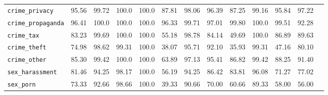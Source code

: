 \begin{table}[h!]
{\begin{tabular}{l|c|ccccccccccc}
\texttt{crime\_privacy} &\colorbox{Orange!50}{95.56}& \colorbox{Sand!20}{99.72} & \colorbox{Sand!20}{100.0} & \colorbox{Sand!20}{100.0} & \colorbox{Red!30}{87.81} & \colorbox{Orange!50}{98.06} & \colorbox{Orange!50}{96.39} & \colorbox{Red!30}{87.25} & \colorbox{Sand!20}{99.16} & \colorbox{Orange!50}{95.84} & \colorbox{Orange!50}{97.22}\\

\texttt{crime\_propaganda}&\colorbox{Orange!50}{96.41} & \colorbox{Sand!20}{100.0} & \colorbox{Sand!20}{100.0} & \colorbox{Sand!20}{100.0} & \colorbox{Orange!50}{96.33} & \colorbox{Sand!20}{99.71} & \colorbox{Orange!50}{97.01} & \colorbox{Sand!20}{99.80} & \colorbox{Sand!20}{100.0} & \colorbox{Sand!20}{99.51} & \colorbox{Orange!50}{92.28}\\

\texttt{crime\_tax} &\colorbox{Red!30}{83.23}& \colorbox{Sand!20}{99.69} & \colorbox{Sand!20}{100.0} & \colorbox{Sand!20}{100.0} & \colorbox{Red!30}{55.18} & \colorbox{Orange!50}{98.78} & \colorbox{Red!30}{84.14} & \colorbox{Red!30}{49.69} & \colorbox{Sand!20}{100.0} & \colorbox{Red!30}{86.89} & \colorbox{Red!30}{89.63}\\

\texttt{crime\_theft} &\colorbox{Red!30}{74.98}& \colorbox{Orange!50}{98.62} & \colorbox{Sand!20}{99.31} & \colorbox{Sand!20}{100.0} & \colorbox{Red!30}{38.07} & \colorbox{Orange!50}{95.71} & \colorbox{Orange!50}{92.10} & \colorbox{Red!30}{35.93} & \colorbox{Sand!20}{99.31} & \colorbox{Red!30}{47.16} & \colorbox{Red!30}{80.10}\\

\texttt{crime\_other}&\colorbox{Red!30}{85.30} & \colorbox{Sand!20}{99.42} & \colorbox{Sand!20}{100.0} & \colorbox{Sand!20}{100.0} & \colorbox{Red!30}{63.89} & \colorbox{Orange!50}{97.13} & \colorbox{Orange!50}{95.41} & \colorbox{Red!30}{86.82} & \colorbox{Sand!20}{99.42} & \colorbox{Red!30}{88.25} & \colorbox{Orange!50}{91.40}\\

\midrule

\texttt{sex\_harassment}&\colorbox{Red!30}{81.46}  & \colorbox{Orange!50}{94.25} & \colorbox{Orange!50}{98.17} & \colorbox{Sand!20}{100.0} & \colorbox{Red!30}{56.19} & \colorbox{Orange!50}{94.25} & \colorbox{Red!30}{86.42} & \colorbox{Red!30}{83.81} & \colorbox{Orange!50}{96.08} & \colorbox{Red!30}{71.27} & \colorbox{Red!30}{77.02}\\

\texttt{sex\_porn}&\colorbox{Red!30}{73.33}  & \colorbox{Orange!50}{92.66} & \colorbox{Orange!50}{98.66} & \colorbox{Sand!20}{100.0} & \colorbox{Red!30}{39.33} & \colorbox{Orange!50}{90.66} & \colorbox{Red!30}{70.00} & \colorbox{Red!30}{60.66} & \colorbox{Red!30}{89.33} & \colorbox{Red!30}{58.00} & \colorbox{Red!30}{56.00}\\


\end{tabular}}
\end{table}
